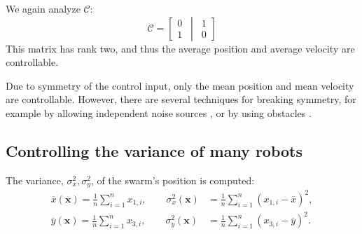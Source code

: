 We again analyze $\mathcal{C}$:
\begin{equation}
\mathcal{C}=\left[ \begin{matrix} 
0\\
1
\end{matrix}
\,\middle\vert\,
 \begin{matrix} 
1\\
0
\end{matrix}
 \right]
\end{equation}
This matrix has rank two, and thus the average position and average velocity are controllable.


Due to symmetry of the control input, only the mean position and mean velocity are controllable. However, there are several techniques for breaking symmetry, for example by allowing independent noise sources \cite{beckerIJRR2014}, or by using obstacles \cite{Becker2013b}.

\subsection{Controlling the variance of many robots}\label{sec:VarianceControl}

The variance, $\sigma_x^2,\sigma_y^2$, of the swarm's position is computed:
\begin{align}\label{eq:meanVar}
 \overline{x}(\mathbf{x}) = \frac{1}{n} \sum_{i=1}^n x_{1,i}, \qquad  %
\sigma_x^2(\mathbf{x}) &= \frac{1}{n} \sum_{i=1}^n (x_{1,i} - \overline{x})^2,  \nonumber \\ 
 \overline{y}(\mathbf{x}) = \frac{1}{n} \sum_{i=1}^n x_{3,i}, \qquad  %
\sigma_y^2(\mathbf{x}) &= \frac{1}{n} \sum_{i=1}^n (x_{3,i} - \overline{y})^2.  
\end{align}

